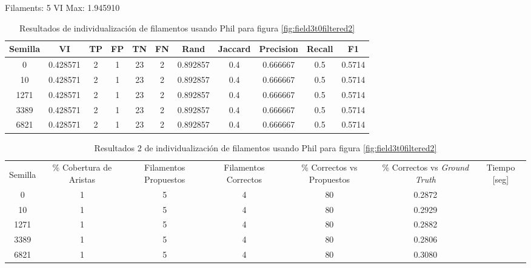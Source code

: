 Filaments: 5	VI Max: 1.945910
\begin{table}[h]
    \centering
    \begin{tabular}{|c|c|c|c|c|c|c|c|c|c|c|}
    \hline
        Semilla & VI & TP & FP &TN &FN & Rand	& Jaccard &	Precision &	Recall &	F1 \\ \hline 
        0    & 0.428571 & 2 & 1 & 23 & 2 & 0.892857 & 0.4 & 0.666667 & 0.5 & 0.5714 \\
        10   & 0.428571 & 2 & 1 & 23 & 2 & 0.892857 & 0.4 & 0.666667 & 0.5 & 0.5714 \\
        1271 & 0.428571 & 2 & 1 & 23 & 2 & 0.892857 & 0.4 & 0.666667 & 0.5 & 0.5714 \\
        3389 & 0.428571 & 2 & 1 & 23 & 2 & 0.892857 & 0.4 & 0.666667 & 0.5 & 0.5714 \\
        6821 & 0.428571 & 2 & 1 & 23 & 2 & 0.892857 & 0.4 & 0.666667 & 0.5 & 0.5714 \\
        \hline
    \end{tabular}
    \caption{Resultados de individualizaci\'on de filamentos usando Phil para figura \ref{fig:field3t0filtered2}}
    \label{tab:field3t0filtered2Results1}
\end{table}


\begin{table}[h]
    \centering
    \begin{tabular}{|c|c|c|c|c|c|c|}
    \hline
         & \multirow{4}{2cm}{\centering \% Cobertura de Aristas} & \multirow{4}{2cm}{Filamentos Propuestos} & \multirow{4}{2cm}{Filamentos Correctos} & \multirow{4}{2.5cm}{\% Correctos vs Propuestos} & \multirow{4}{2.5cm}{\centering \% Correctos vs {\it Ground Truth}} & \multirow{4}{1.2cm}{\centering Tiempo [seg]} \\
         &  &  &  & & &  \\
        Semilla &  &  &  & & &  \\
        &  &  &  & & &  \\ \hline 
        0 & 1 & 5 & 4 & 80 & 0.2872 \\
        10 & 1 & 5 & 4 & 80 & 0.2929\\
        1271 & 1 & 5 & 4 & 80 & 0.2882\\
        3389 & 1 & 5 & 4 & 80 & 0.2806\\
        6821 & 1 & 5 & 4 & 80 & 0.3080\\
        \hline
    \end{tabular}
    \caption{Resultados 2 de individualizaci\'on de filamentos usando Phil para figura \ref{fig:field3t0filtered2}}
    \label{tab:field3t0filtered2Results2}
\end{table}